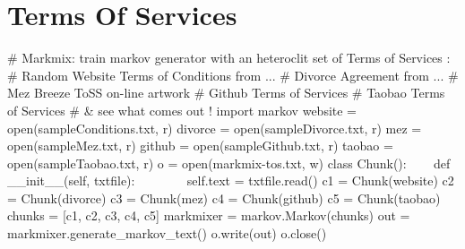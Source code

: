 \section{Terms Of Services}

\# Markmix: train markov generator with an heteroclit set of Terms of
Services :\newline
\# Random Website Terms of Conditions from ...\newline
\# Divorce Agreement from ...\newline
\# Mez Breeze ToSS on-line artwork\newline
\# Github Terms of Services\newline
\# Taobao Terms of Services\newline
\# \& see what comes out !\newline
\newline
import markov\newline
\newline
website = open({\textquotedbl}sampleConditions.txt{\textquotedbl},
{\textquotedbl}r{\textquotedbl})\newline
divorce = open({\textquotedbl}sampleDivorce.txt{\textquotedbl},
{\textquotedbl}r{\textquotedbl})\newline
mez = open({\textquotedbl}sampleMez.txt{\textquotedbl},
{\textquotedbl}r{\textquotedbl})\newline
github = open({\textquotedbl}sampleGithub.txt{\textquotedbl},
{\textquotedbl}r{\textquotedbl})\newline
taobao = open({\textquotedbl}sampleTaobao.txt{\textquotedbl},
{\textquotedbl}r{\textquotedbl})\newline
o = open({\textquotedbl}markmix-tos.txt{\textquotedbl},
{\textquotedbl}w{\textquotedbl})\newline
\newline
class Chunk():\newline
~~~ def \_\_init\_\_(self, txtfile):\newline
~~~~~~~ self.text = txtfile.read()\newline
\newline
c1 = Chunk(website)\newline
c2 = Chunk(divorce)\newline
c3 = Chunk(mez)\newline
c4 = Chunk(github)\newline
c5 = Chunk(taobao)\newline
chunks = [c1, c2, c3, c4, c5]\newline
\newline
markmixer = markov.Markov(chunks)\newline
\newline
out = markmixer.generate\_markov\_text()\newline
\newline
o.write(out)\newline
o.close()

~
